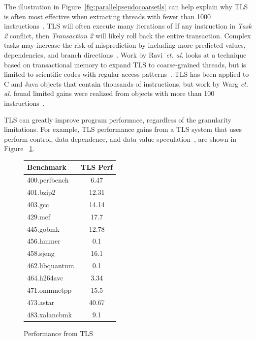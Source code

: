 \documentclass[defaultstyle,11pt]{thesis}
\begin{document}
The illustration in Figure~\ref{fig:parallelpseudocoarsetls} can help
explain why TLS is often most effective when extracting threads with
fewer than 1000 instructions~\cite{marcuello:00:ipdps}.  TLS will
often execute many iterations of If any instruction in \textit{Task 2}
conflict, then \textit{Transaction 2} will likely roll back the entire
transaction.  Complex tasks may increase the risk of misprediction by
including more predicted values, dependencies, and branch
directions~\cite{marcuello:00:ipdps}. Work by Ravi~\textit{et. al.}
looks at a technique based on transactional memory to expand TLS to
coarse-grained threads, but is limited to scientific codes with
regular access patterns~\cite{ramaseshan:08:nc}. TLS has been applied
to C and Java objects that contain thousands of instructions, but work
by Warg \textit{et. al.} found limited gains were realized from
objects with more than 100 instructions~\cite{warg:2001:pact}.

TLS can greatly improve program performace, regardless of the
granularity limitations. For example, TLS performance gains from a TLS
system that uses perform control, data dependence, and data value
speculation~\cite{kejariwal:2007:tap}, are shown in Figure
~\ref{fig:tlsperf}.

\begin{figure}
  \begin{centering}
    \begin{minipage}{\hsize}
      \begin{tabular}{ l c }
        Benchmark & TLS Perf \\
        \hline
        400.perlbench & 6.47 \\
        401.bzip2 & 12.31 \\
        403.gcc & 14.14 \\
        429.mcf & 17.7 \\
        445.gobmk & 12.78 \\
        456.hmmer & 0.1 \\
        458.sjeng & 16.1 \\
        462.libquantum & 0.1 \\
        464.h264avc & 3.34 \\
        471.ommnetpp & 15.5 \\
        473.astar & 40.67 \\
        483.xalancbmk & 9.1 \\
      \end{tabular}
    \end{minipage}
  \end{centering}
  \caption{Performance from TLS~\cite{kejariwal:2007:tap}}
  \label{fig:tlsperf}
\end{figure}
\end{document}
